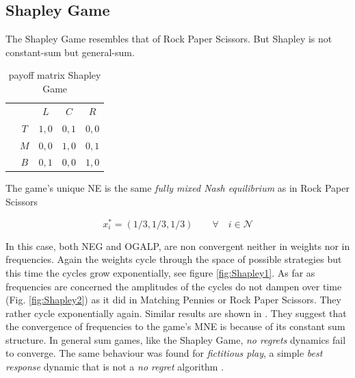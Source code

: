 \subsection{Shapley Game}\label{subsection:shapleyGame}

The Shapley Game resembles that of Rock Paper Scissors. But Shapley is not constant-sum but general-sum.  

\begin{table}[H]\centering
\setlength{\extrarowheight}{2pt}
\begin{tabular}{cc|c|c|c|}
  & \multicolumn{1}{c}{} & \multicolumn{1}{c}{$L$}  & \multicolumn{1}{c}{$C$}  & \multicolumn{1}{c}{$R$} \\\cline{3-5}
            & $T$ & $1,0$ & $0,1$ & $0,0$ \\ \cline{3-5}
            & $M$ & $0,0$ & $1,0$ & $0,1$ \\\cline{3-5}
            & $B$ & $0,1$ & $0,0$ & $1,0$ \\\cline{3-5}
\end{tabular}\caption{\label{tab:payoffShapley}payoff matrix Shapley Game}
\end{table}

The game's unique NE is the same \textit{fully mixed Nash equilibrium} as in Rock Paper Scissors

\begin{equation*}
    x_{i}^{*} = (1/3,1/3,1/3) \qquad \forall \quad i \in \mathcal{N}
\end{equation*}

In this case, both NEG and OGALP, are non convergent neither in weights nor in frequencies. Again the weights cycle through the space of possible strategies but this time the cycles grow exponentially, see figure \ref{fig:Shapley1}. As far as frequencies are concerned the amplitudes of the cycles do not dampen over time (Fig. \ref{fig:Shapley2}) as it did in Matching Pennies or Rock Paper Scissors. They rather cycle exponentially again. Similar results are shown in \cite{jafari}. They suggest that the convergence of frequencies to the game's MNE is because of its constant sum structure. In general sum games, like the Shapley Game, \textit{no regrets} dynamics fail to converge. The same behaviour was found for \textit{fictitious play}, a simple \textit{best response} dynamic that is not a \textit{no regret} algorithm \cite{jafari}.

